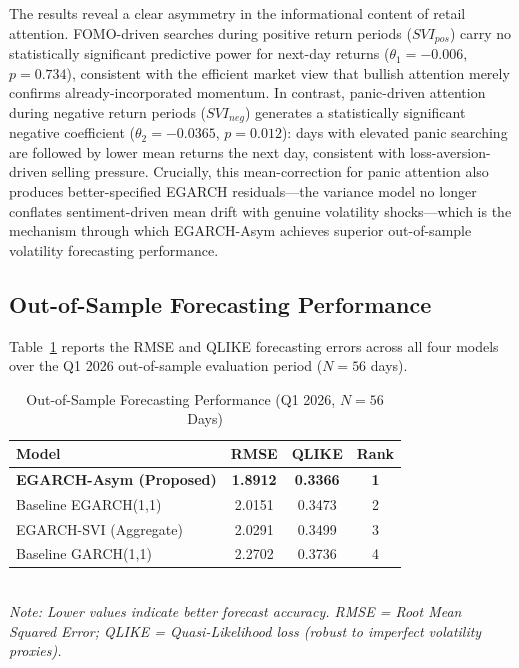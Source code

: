 \documentclass[12pt, a4paper]{article}
\begin{document}
The results reveal a clear asymmetry in the informational content of retail attention. FOMO-driven searches during positive return periods ($SVI_{pos}$) carry no statistically significant predictive power for next-day returns ($\theta_1 = -0.006$, $p = 0.734$), consistent with the efficient market view that bullish attention merely confirms already-incorporated momentum. In contrast, panic-driven attention during negative return periods ($SVI_{neg}$) generates a statistically significant negative coefficient ($\theta_2 = -0.0365$, $p = 0.012$): days with elevated panic searching are followed by lower mean returns the next day, consistent with loss-aversion-driven selling pressure. Crucially, this mean-correction for panic attention also produces better-specified EGARCH residuals—the variance model no longer conflates sentiment-driven mean drift with genuine volatility shocks—which is the mechanism through which EGARCH-Asym achieves superior out-of-sample volatility forecasting performance.

\subsection{Out-of-Sample Forecasting Performance}

Table~\ref{tab:oos} reports the RMSE and QLIKE forecasting errors across all four models over the Q1 2026 out-of-sample evaluation period ($N=56$ days).

\begin{table}[H]
\centering
\caption{Out-of-Sample Forecasting Performance (Q1 2026, $N = 56$ Days)}
\label{tab:oos}
\small
\begin{tabular}{lccc}
\toprule
Model & RMSE & QLIKE & Rank \\
\midrule
\textbf{EGARCH-Asym (Proposed)} & \textbf{1.8912} & \textbf{0.3366} & \textbf{1} \\
Baseline EGARCH(1,1)            & 2.0151          & 0.3473          & 2 \\
EGARCH-SVI (Aggregate)          & 2.0291          & 0.3499          & 3 \\
Baseline GARCH(1,1)             & 2.2702          & 0.3736          & 4 \\
\bottomrule
\end{tabular}
\smallskip\\
\footnotesize\textit{Note: Lower values indicate better forecast accuracy. RMSE = Root Mean Squared Error; QLIKE = Quasi-Likelihood loss (robust to imperfect volatility proxies).}
\end{table}
\end{document}
